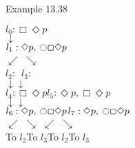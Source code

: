 \documentclass[style=simple,size=12pt]{powerdot}
\begin{document}
\begin{wideslide}[bm=,toc=]{Example 13.38}
\begin{center}
$l_{0}:\Box \Diamond p$ \\
$\downarrow$ \\
$l_{1}:\Diamond p,\: \mathord{\ocircle} \Box \Diamond p$ \\
$\swarrow$ \hspace{2em} $\searrow$ \\
\smallskip
\hspace*{1em}$l_{2}:\,$ \hspace{3em}
$l_{3}:\,$ \\
\smallskip
\hspace*{1em}$\downarrow$\hspace*{10em}$\downarrow$ \\
\hspace*{2.5em}$l_{4}:\Box \Diamond p$\hspace*{7em}$l_{5}:\Diamond p\comma \Box \Diamond p$ \\
\smallskip
\hspace*{1em}$\downarrow$\hspace*{10em}$\downarrow$ \\
\hspace*{2em}$l_{6}:\Diamond p,\: \mathord{\ocircle} \Box \Diamond p$\hspace*{5em}$l_{7}:\Diamond p,\: \mathord{\ocircle}\Box \Diamond p$ \\
\hspace*{2em}$\swarrow$ \hspace{2em} $\searrow$ \hspace*{6em}$\swarrow$ \hspace{2em} $\searrow$ \\
\hspace*{2.5em}To $l_{2}$\hspace*{3.5em}To $l_{3}$\hspace*{4em}To $l_{2}$\hspace*{2.5em}To $l_{3}$\\
\end{center}
\end{wideslide}
\end{document}
